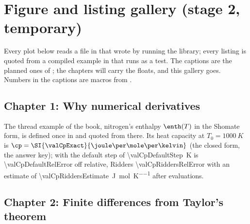 \chapter{Figure and listing gallery (stage 2, temporary)}\label{ch:gallery}

Every plot below reads a file in  that  wrote by running the library;
every listing is quoted from a compiled example in  that runs as a test. The captions are the planned
ones of ; the chapters will carry the floats, and this gallery goes. Numbers in the captions are
\code{\val} macros from .

\section{Chapter 1: Why numerical derivatives}

\begin{marginfigure}
\centering

\caption{F1. A smooth curve with the tangent at $x$ and the secants through $(x, x+h)$ and $(x-h, x+h)$: the
central secant is nearly parallel to the tangent. A diagram without data.\label{fig:secant}}
\end{marginfigure}

The thread example of the book, nitrogen's enthalpy $\enth(T)$ in the Shomate form, is defined once in
 and quoted from there. Its heat capacity at $T_0 = \SI{1000}{K}$ is
$\cp = \SI{\valCpExact}{\joule\per\mole\per\kelvin}$ (the closed form, the answer key);  with the
default step of \SI{\valCpDefaultStep}{K} is \num{\valCpDefaultRelError} off relative, Ridders
\num{\valCpRiddersRelError} with an estimate of \SI{\valCpRiddersEstimate}{\joule\per\mole\per\kelvin} after
\valCpRiddersEvals{} evaluations.

\clearpage
\section{Chapter 2: Finite differences from Taylor's theorem}

